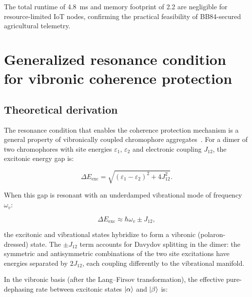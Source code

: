 \documentclass[11pt,a4paper]{article}
\begin{document}
The total runtime of \qty{4.8}{\ms} and memory footprint of \qty{2.2}{\kB} are negligible for resource-limited IoT nodes, confirming the practical feasibility of BB84-secured agricultural telemetry.


\section{Generalized resonance condition for vibronic coherence protection}
\label{SI-sec:resonance}

\subsection{Theoretical derivation}

The resonance condition that enables the coherence protection mechanism is a general property of vibronically coupled chromophore aggregates~\cite{Chin2013,Christensson2012}.
For a dimer of two chromophores with site energies $\varepsilon_1$, $\varepsilon_2$ and electronic coupling $J_{12}$, the excitonic energy gap is:

\begin{equation}
\Delta E_{\mathrm{exc}} = \sqrt{(\varepsilon_1 - \varepsilon_2)^2 + 4J_{12}^2}.
\label{eq:SI_exciton_gap}
\end{equation}

When this gap is resonant with an underdamped vibrational mode of frequency $\omega_v$:

\begin{equation}
\Delta E_{\mathrm{exc}} \approx \hbar\omega_v \pm J_{12},
\label{eq:SI_resonance_condition}
\end{equation}

the excitonic and vibrational states hybridize to form a vibronic (polaron-dressed) state.
The $\pm J_{12}$ term accounts for Davydov splitting in the dimer: the symmetric and antisymmetric combinations of the two site excitations have energies separated by $2J_{12}$, each coupling differently to the vibrational manifold.

In the vibronic basis (after the Lang--Firsov transformation), the effective pure-dephasing rate between excitonic states $\ket{\alpha}$ and $\ket{\beta}$ is:
\end{document}
